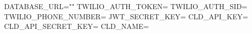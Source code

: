 DATABASE_URL=""
TWILIO_AUTH_TOKEN=
TWILIO_AUTH_SID=
TWILIO_PHONE_NUMBER=
JWT_SECRET_KEY=
CLD_API_KEY=
CLD_API_SECRET_KEY=
CLD_NAME=